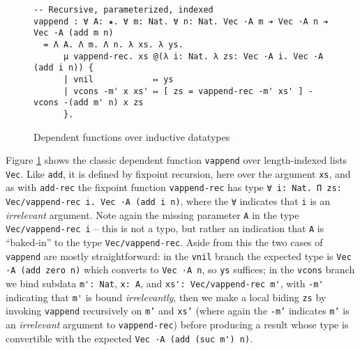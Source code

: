 \documentclass{article}
\begin{document}
\begin{figure}[h]
\begin{verbatim}
-- Recursive, parameterized, indexed
vappend : ∀ A: ★. ∀ m: Nat. ∀ n: Nat. Vec ·A m ➔ Vec ·A n ➔ Vec ·A (add m n)
  = Λ A. Λ m. Λ n. λ xs. λ ys.
      μ vappend-rec. xs @(λ i: Nat. λ zs: Vec ·A i. Vec ·A (add i n)) {
      | vnil            ↦ ys
      | vcons -m' x xs' ↦ [ zs = vappend-rec -m' xs' ] - vcons -(add m' n) x zs
      }.
\end{verbatim}
  \caption{Dependent functions over inductive datatypes}
  \label{fig:ex-data-dep}
\end{figure}

Figure \ref{fig:ex-data-dep} shows the classic dependent function
\texttt{vappend} over length-indexed lists \texttt{Vec}. Like \texttt{add}, it is
defined by fixpoint recursion, here over the argument \texttt{xs}, and as with
\texttt{add-rec} the fixpoint function \texttt{vappend-rec} has type
\verb;∀ i: Nat. Π zs: Vec/vappend-rec i. Vec ·A (add i n);, where the \texttt{∀}
indicates that \texttt{i} is an \textit{irrelevant} argument. Note again the
missing parameter \texttt{A} in the type \texttt{Vec/vappend-rec i} -- this is
not a typo, but rather an indication that \texttt{A} is ``baked-in'' to the type
\texttt{Vec/vappend-rec}. Aside from this the two cases of \texttt{vappend} are
mostly straightforward: in the \texttt{vnil} branch the expected type is
\verb;Vec ·A (add zero n); which converts to \verb;Vec ·A n;, so \texttt{ys}
suffices; in the \texttt{vcons} branch we bind subdata \verb;m': Nat;,
\verb;x: A;, and \verb;xs': Vec/vappend-rec m';, with \verb;-m'; indicating
that \verb;m'; is bound \textit{irrelevantly}, then we make a local biding
\texttt{zs} by invoking \verb;vappend; recursively on \texttt{m'} and
\texttt{xs'} (where again the \texttt{-m'} indicates \texttt{m'} is an
\textit{irrelevant} argument to \texttt{vappend-rec}) before producing a result whose type is
convertible with the expected \verb;Vec ·A (add (suc m') n);.
\end{document}
